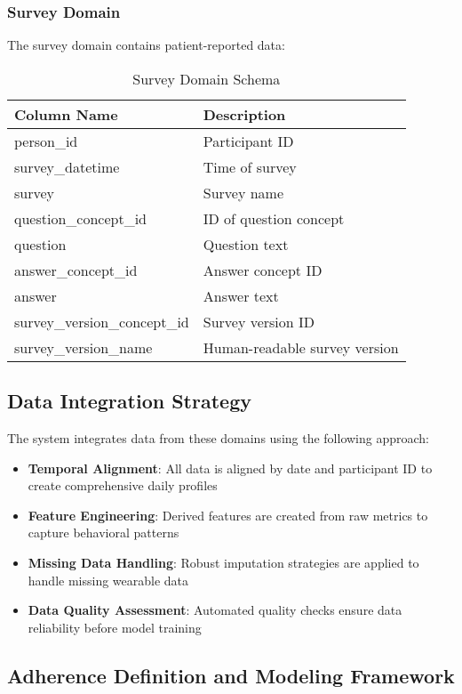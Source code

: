 \documentclass[12pt]{article}
\begin{document}
\subsubsection{Survey Domain}
The survey domain contains patient-reported data:
\begin{table}[h]
\centering
\begin{tabular}{|l|l|}
\hline
\textbf{Column Name} & \textbf{Description} \\
\hline
person\_id & Participant ID \\
survey\_datetime & Time of survey \\
survey & Survey name \\
question\_concept\_id & ID of question concept \\
question & Question text \\
answer\_concept\_id & Answer concept ID \\
answer & Answer text \\
survey\_version\_concept\_id & Survey version ID \\
survey\_version\_name & Human-readable survey version \\
\hline
\end{tabular}
\caption{Survey Domain Schema}
\end{table}

\subsection{Data Integration Strategy}
The system integrates data from these domains using the following approach:

\begin{itemize}
    \item \textbf{Temporal Alignment}: All data is aligned by date and participant ID to create comprehensive daily profiles
    \item \textbf{Feature Engineering}: Derived features are created from raw metrics to capture behavioral patterns
    \item \textbf{Missing Data Handling}: Robust imputation strategies are applied to handle missing wearable data
    \item \textbf{Data Quality Assessment}: Automated quality checks ensure data reliability before model training
\end{itemize}

\subsection{Adherence Definition and Modeling Framework}
\end{document}
